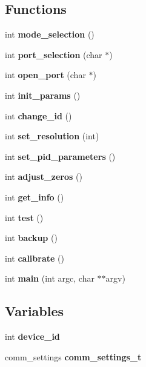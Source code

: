\subsection*{Functions}
\begin{DoxyCompactItemize}
\item 
\mbox{\label{qbmove__init_8c_a44a4c36b1ed6edb012d9274fff39b156}} 
int {\bfseries mode\+\_\+selection} ()
\item 
\mbox{\label{qbmove__init_8c_a4347eeebb915c2bd627acfbe8cda5bb9}} 
int {\bfseries port\+\_\+selection} (char $\ast$)
\item 
\mbox{\label{qbmove__init_8c_a61a603d6ab622032ccf84775af74e960}} 
int {\bfseries open\+\_\+port} (char $\ast$)
\item 
\mbox{\label{qbmove__init_8c_ae0277117c43ff0ef7a3d500b96b003dd}} 
int {\bfseries init\+\_\+params} ()
\item 
\mbox{\label{qbmove__init_8c_a9f6588e3ddc3b88a01e5a0b4aa69079a}} 
int {\bfseries change\+\_\+id} ()
\item 
\mbox{\label{qbmove__init_8c_a8885d811c76fcef106bcb8260f8ae104}} 
int {\bfseries set\+\_\+resolution} (int)
\item 
\mbox{\label{qbmove__init_8c_ae95df945f6585dd892b8db7f3b9d48c5}} 
int {\bfseries set\+\_\+pid\+\_\+parameters} ()
\item 
\mbox{\label{qbmove__init_8c_a6070a0e69179adfda4f304f3ed7fbae7}} 
int {\bfseries adjust\+\_\+zeros} ()
\item 
\mbox{\label{qbmove__init_8c_a132b1b4c75e319d8d64a46b357857d04}} 
int {\bfseries get\+\_\+info} ()
\item 
\mbox{\label{qbmove__init_8c_ac8da963855e09bf929c085486f4a3b47}} 
int {\bfseries test} ()
\item 
\mbox{\label{qbmove__init_8c_a31a926c8b1f1d3abbde649bc34133547}} 
int {\bfseries backup} ()
\item 
\mbox{\label{qbmove__init_8c_aa78cef14864eb28be4f47d1ebf0e29f1}} 
int {\bfseries calibrate} ()
\item 
\mbox{\label{qbmove__init_8c_a3c04138a5bfe5d72780bb7e82a18e627}} 
int {\bfseries main} (int argc, char $\ast$$\ast$argv)
\end{DoxyCompactItemize}
\subsection*{Variables}
\begin{DoxyCompactItemize}
\item 
\mbox{\label{qbmove__init_8c_accfd0301c469314772cc651ec198d492}} 
int {\bfseries device\+\_\+id}
\item 
\mbox{\label{qbmove__init_8c_a92153f4b70cd8ba4e9b502ccff8d28bf}} 
comm\+\_\+settings {\bfseries comm\+\_\+settings\+\_\+t}
\end{DoxyCompactItemize}


